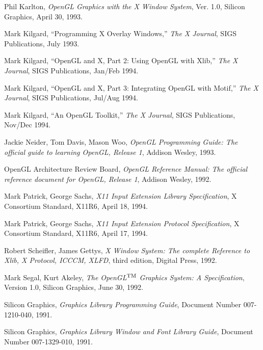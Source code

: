 {\footnotesize
{}
}

\newpage


\begin{thebibliography}{99}

 Phil Karlton, {\em OpenGL Graphics with the X
Window System}, Ver. 1.0, Silicon Graphics, April 30, 1993.

Mark Kilgard, ``Programming X Overlay Windows,'' {\em The X Journal},
SIGS Publications, July 1993.

Mark Kilgard, ``OpenGL and X, Part 2: Using OpenGL with Xlib,''
{\em The X Journal}, SIGS Publications, Jan/Feb 1994.

Mark Kilgard, ``OpenGL and X, Part 3: Integrating OpenGL with Motif,''
{\em The X Journal}, SIGS Publications, Jul/Aug 1994.

Mark Kilgard, ``An OpenGL Toolkit,''
{\em The X Journal}, SIGS Publications, Nov/Dec 1994.

Jackie Neider, Tom Davis, Mason Woo, {\em OpenGL Programming Guide:
The official guide to learning OpenGL, Release 1}, Addison Wesley, 1993.

OpenGL Architecture Review Board, {\em OpenGL Reference Manual:  The
official reference document for OpenGL, Release 1}, Addison Wesley, 1992.

Mark Patrick, George Sachs, {\em X11 Input Extension Library Specification}, 
X Consortium Standard, X11R6, April 18, 1994.

Mark Patrick, George Sachs, {\em X11 Input Extension Protocol Specification}, 
X Consortium Standard, X11R6, April 17, 1994.

Robert Scheifler, James Gettys, {\em X Window System: The complete Reference
to Xlib, X Protocol, ICCCM, XLFD}, third edition, Digital Press, 1992.

Mark Segal, Kurt Akeley, {\em The OpenGL${}^{\rm TM}$ Graphics System:
A Specification}, Version 1.0, Silicon Graphics, June 30, 1992.

Silicon Graphics, {\em Graphics Library Programming Guide},
Document Number 007-1210-040, 1991.

Silicon Graphics, {\em Graphics Library Window and Font Library Guide},
Document Number 007-1329-010, 1991.

\end{thebibliography}

\newpage





